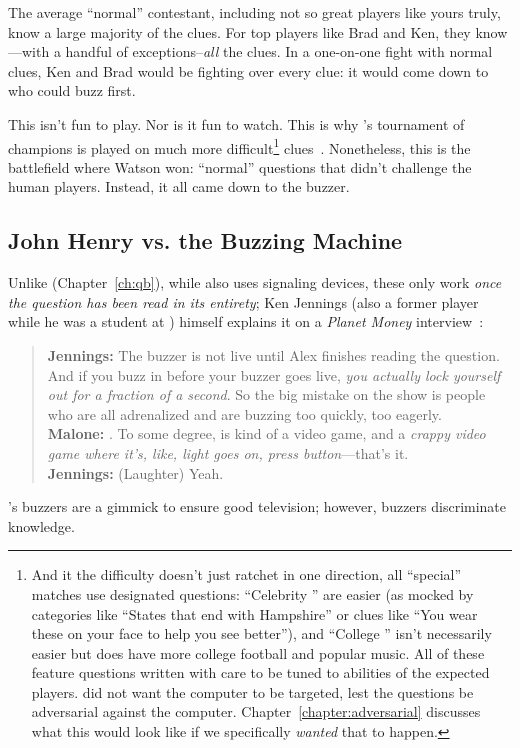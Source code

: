 The average ``normal'' \jeopardy{} contestant, including not so great
players like yours truly, know a large majority of the clues.
%
For top players like Brad and Ken, they know---with a handful of
exceptions--\emph{all} the clues.
%
In a one-on-one fight with normal clues, Ken and Brad would be fighting over
every clue: it would come down to who could buzz first.

This isn't fun to play.
%
Nor is it fun to watch.
%
This is why \jeopardy{}'s tournament of champions is played on much
more difficult\footnote{And it the difficulty doesn't just ratchet in one
  direction, all ``special''
  matches use designated questions: ``Celebrity \jeopardy{}'' are easier (as mocked by
  categories like ``States that end with Hampshire'' or clues like ``You wear
  these on your face to help you see better''), and ``College \jeopardy{}''
  isn't necessarily easier but does have more college football and popular
  music.  All of these feature questions written with care to be tuned to abilities of the
  expected players.   did not want the computer to be targeted, lest
  the questions be adversarial against the computer.
  Chapter~\ref{chapter:adversarial} discusses what this would look like if we
  specifically \emph{wanted} that to happen.} clues~\citep{harris-06}.
%
Nonetheless, this is the battlefield where Watson won: ``normal''
questions that didn't challenge the human players.
%
Instead, it all came down to the buzzer.

\subsection{John Henry vs. the Buzzing Machine}
\label{sec:watson:human-buzzing}

Unlike \qb{} (Chapter~\ref{ch:qb}), while \jeopardy{} also uses
signaling devices, these only work \emph{once the question has been
  read in its entirety}; Ken Jennings (also a former \qb{} player while he was a student at
) himself explains it on a \textit{Planet Money}
interview~\citep{malone-19}:
\begin{quote}
{\bf Jennings:} The buzzer is
    not live until Alex finishes reading the question. And if you buzz
    in before your buzzer goes live, \emph{you actually lock yourself out
    for a fraction of a second}. So the big mistake on the show is
    people who are all adrenalized and are buzzing too quickly, too
    eagerly. \\
{\bf Malone:} . To some degree, \jeopardy{} is kind of a video game, and a \emph{crappy video game where it's, like, light goes on, press button}---that's it. \\
{\bf Jennings:} (Laughter) Yeah. \\
\end{quote}
\jeopardy{}'s buzzers are a gimmick to ensure good television; however, \qb{}
buzzers discriminate knowledge.

